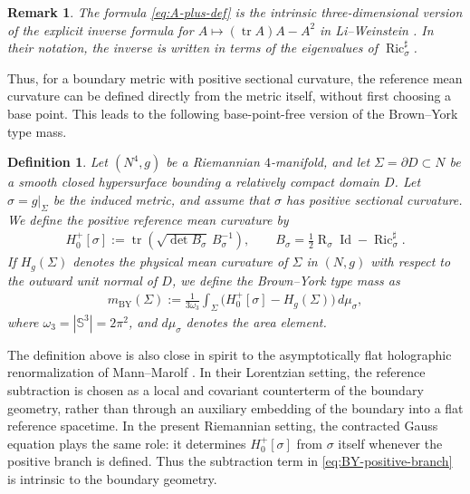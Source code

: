 \documentclass[10pt,a4paper]{amsart}
\newcommand{\Sph}{\mathbb{S}}
\newcommand{\tr}{\operatorname{tr}}
\newcommand{\Ric}{\operatorname{Ric}}
\newcommand{\Id}{\operatorname{Id}}
\newcommand{\Scal}{\operatorname{R}}
\newcommand{\BY}{\mathrm{BY}}
\newtheorem{definition}[theorem]{Definition}
\newtheorem{remark}[theorem]{Remark}
\begin{document}
	\begin{remark}
		The formula \eqref{eq:A-plus-def} is the intrinsic three-dimensional
		version of the explicit inverse formula for
		$A\mapsto(\tr A)A-A^2$ in Li--Weinstein \cite{LiWeinstein}. In their
		notation, the inverse is written in terms of the eigenvalues of
		$\Ric_\sigma^\sharp$.
	\end{remark}
	
	\medskip
	
	Thus, for a boundary metric with positive sectional curvature, the reference mean
	curvature can be defined directly from the metric itself, without first choosing
	a base point. This leads to the following base-point-free version of the
	Brown--York type mass.
	
	\begin{definition}
		Let $(N^4,g)$ be a Riemannian $4$-manifold, and let
		$\Sigma=\partial D\subset N$ be a smooth closed hypersurface bounding a
		relatively compact domain $D$. Let $\sigma=g|_\Sigma$ be the induced metric,
		and assume that $\sigma$ has positive sectional curvature. We define the
		positive reference mean curvature by
		\begin{align}
			H_0^+[\sigma]
			:=
			\tr
			\left(
			\sqrt{\det B_\sigma}\,B_\sigma^{-1}
			\right),
			\qquad
			B_\sigma
			=
			\frac12\Scal_\sigma\Id-\Ric_\sigma^\sharp.
		\end{align}
		If $H_g(\Sigma)$ denotes the physical mean curvature of $\Sigma$ in $(N,g)$ with
		respect to the outward unit normal of $D$, we define the Brown--York type mass as
		\begin{align}\label{eq:BY-positive-branch}
			m_{\BY}(\Sigma)
			:=
			\frac{1}{3\omega_3}
			\int_\Sigma
			\bigl(
			H_0^+[\sigma]-H_g(\Sigma)
			\bigr)\,d\mu_\sigma,
		\end{align}
		where $\omega_3=|\Sph^3|=2\pi^2$, and $d\mu_\sigma$ denotes the area element.
	\end{definition}
	
	The definition above is also close in spirit to the asymptotically flat
	holographic renormalization of Mann--Marolf \cite{MannMarolf}. In their
	Lorentzian setting, the reference subtraction is chosen as a local and covariant
	counterterm of the boundary geometry, rather than through an auxiliary embedding
	of the boundary into a flat reference spacetime. In the present Riemannian setting, the contracted Gauss equation plays the
	same role: it determines $H_0^+[\sigma]$ from $\sigma$ itself whenever the positive
	branch is defined. Thus the subtraction term in
	\eqref{eq:BY-positive-branch} is intrinsic to the boundary geometry.
	
\end{document}
